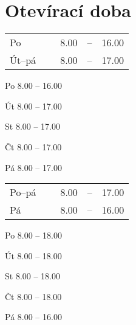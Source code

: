 




  \newpage
\section{Otevírací doba}

\noindent{}

\ifdefined\HCode
\begin{tabular}{lllll}
  Po      & ~ & 8.00 &--& 16.00\\
  Út--pá  & ~ & 8.00 &--& 17.00
\end{tabular}

\else
Po 8.00 -- 16.00

Út 8.00 -- 17.00

St 8.00 -- 17.00

Čt 8.00 -- 17.00

Pá 8.00 -- 17.00
\fi

\noindent{}

\ifdefined\HCode
\begin{tabular}{lllll}
  Po--pá & ~ & 8.00 &--& 17.00\\
  Pá     & ~ & 8.00 &--& 16.00
\end{tabular}
\else
Po 8.00 -- 18.00

Út 8.00 -- 18.00

St 8.00 -- 18.00

Čt 8.00 -- 18.00

Pá 8.00 -- 16.00
\fi

\newpage
